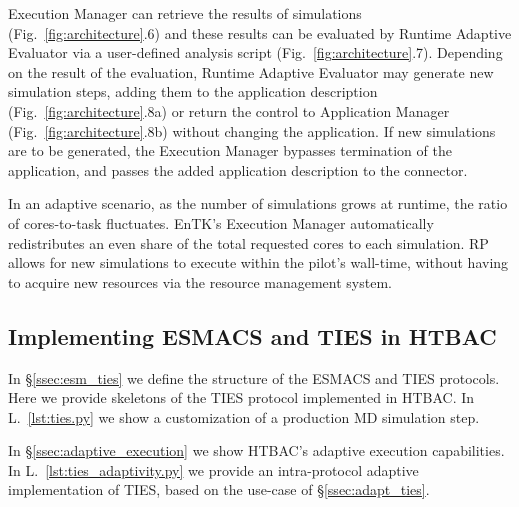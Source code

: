 Execution Manager can retrieve the results of simulations
(Fig.~\ref{fig:architecture}.6) and these results can be evaluated by Runtime
Adaptive Evaluator via a user-defined analysis script
(Fig.~\ref{fig:architecture}.7). Depending on the result of the evaluation,
Runtime Adaptive Evaluator may generate new simulation steps, adding them to
the application description (Fig.~\ref{fig:architecture}.8a) or return the
control to Application Manager (Fig.~\ref{fig:architecture}.8b) without
changing the application. If new simulations are to be generated, the
Execution Manager bypasses termination of the application, and passes the
added application description to the connector.


In an adaptive scenario, as the number of simulations grows at runtime, the
ratio of cores-to-task fluctuates. EnTK's Execution Manager automatically
redistributes an even share of the total requested cores to each simulation.
RP allows for new simulations to execute within the pilot's wall-time,
without having to acquire new resources via the resource management system.

\subsection{Implementing ESMACS and TIES in
HTBAC}\label{sec:implementation_htbac}

In \S\ref{ssec:esm_ties} we define the structure of the ESMACS and TIES
protocols. Here we provide skeletons of the TIES protocol implemented in
HTBAC\@. In L.~\ref{lst:ties.py} we show a customization of a production
MD simulation step.



In \S\ref{ssec:adaptive_execution} we show HTBAC's adaptive execution
capabilities. In L.~\ref{lst:ties_adaptivity.py} we provide an
intra-protocol adaptive implementation of TIES, based on the use-case
of \S\ref{ssec:adapt_ties}.

